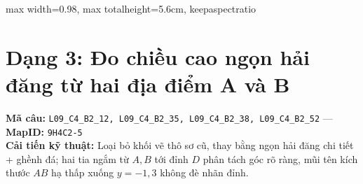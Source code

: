 \documentclass[10pt,a4paper]{article}
\begin{document}
\begin{minipage}[t]{0.54\textwidth}
\begin{tcolorbox}[colback=green!4!white,colframe=green!60!black,title={\textbf{HÌNH MỚI (Chuẩn hóa \& Đổi số động)}},top=2mm,bottom=2mm,left=2mm,right=2mm]
\begin{center}
\begin{adjustbox}{max width=0.98\linewidth, max totalheight=5.6cm, keepaspectratio}
\end{adjustbox}
\end{center}
\end{tcolorbox}
\end{minipage}
\newpage


\section{Dạng 3: Đo chiều cao ngọn hải đăng từ hai địa điểm A và B}
\noindent\textbf{Mã câu:} \texttt{L09\_C4\_B2\_12, L09\_C4\_B2\_35, L09\_C4\_B2\_38, L09\_C4\_B2\_52} \quad---\quad \textbf{MapID:} \texttt{9H4C2-5}\\[2mm]
\textbf{Cải tiến kỹ thuật:} Loại bỏ khối vẽ thô sơ cũ, thay bằng ngọn hải đăng chi tiết + ghềnh đá; hai tia ngắm từ $A, B$ tới đỉnh $D$ phân tách góc rõ ràng, mũi tên kích thước $AB$ hạ thấp xuống $y=-1{,}3$ không đè nhãn đỉnh.\\[3mm]
\noindent
\end{document}
